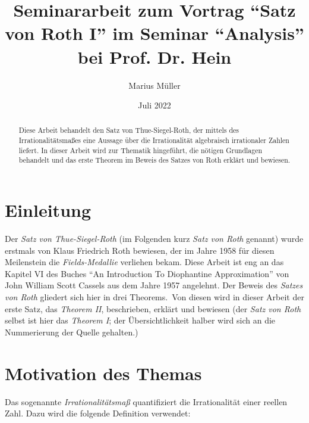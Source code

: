 \documentclass[11pt]{article}
\title{Seminararbeit zum Vortrag ``Satz von Roth I'' im Seminar ``Analysis'' bei Prof. Dr. Hein}
\author{Marius Müller}
\date{Juli 2022}
\begin{document}
    \maketitle

    \vfill

    \begin{abstract}
        \textrm{Diese Arbeit behandelt den Satz von Thue-Siegel-Roth,
        der mittels des Irrationalitätsmaßes eine Aussage über die Irrationalität algebraisch irrationaler Zahlen liefert.
        \newline
        In dieser Arbeit wird zur Thematik hingeführt, die nötigen Grundlagen behandelt und das erste Theorem im Beweis
        des Satzes von Roth erklärt und bewiesen.}
    \end{abstract}

    \newpage

    \tableofcontents

    \newpage

    \section{Einleitung}
    \label{sec:intro}
        \textrm{Der \emph{Satz von Thue-Siegel-Roth} (im Folgenden kurz \emph{Satz von Roth} genannt) wurde erstmals von
        Klaus Friedrich Roth bewiesen, der im Jahre 1958 für diesen Meilenstein die \emph{Fields-Medallie} verliehen bekam.
        \newline
        Diese Arbeit ist eng an das Kapitel VI des Buches ``An Introduction To Diophantine Approximation'' von
        John William Scott Cassels aus dem Jahre 1957 angelehnt.
        \newline
        Der Beweis des \emph{Satzes von Roth} gliedert sich hier in drei Theorems.\ Von diesen wird in dieser
        Arbeit der erste Satz, das \emph{Theorem II}, beschrieben, erklärt und bewiesen (der \emph{Satz von Roth} selbst
        ist hier das \emph{Theorem I}; der Übersichtlichkeit halber wird sich an die Nummerierung der Quelle gehalten.)}

    \section{Motivation des Themas}
    \label{sec:motivation}
        \textrm{Das sogenannte \emph{Irrationalitätsmaß} quantifiziert die Irrationalität einer reellen Zahl. Dazu wird
        die folgende Definition verwendet:}
\end{document}
